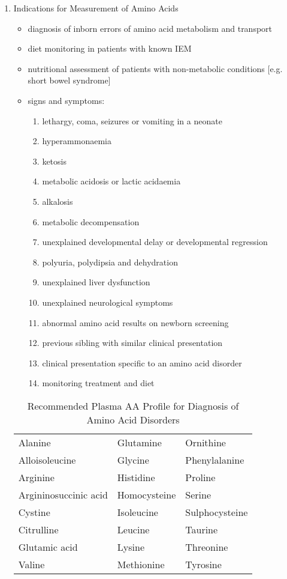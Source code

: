 \documentclass{scrartcl}
\begin{document}
\begin{enumerate}
\item Indications for Measurement of Amino Acids
\label{sec:orgfa119e3}
\begin{itemize}
\item diagnosis of inborn errors of amino acid metabolism and transport
\item diet monitoring in patients with known IEM
\item nutritional assessment of patients with non-metabolic conditions [e.g. short bowel syndrome]
\item signs and symptoms:
\begin{enumerate}
\item lethargy, coma, seizures or vomiting in a neonate
\item hyperammonaemia
\item ketosis
\item metabolic acidosis or lactic acidaemia
\item alkalosis
\item metabolic decompensation
\item unexplained developmental delay or developmental regression
\item polyuria, polydipsia and dehydration
\item unexplained liver dysfunction
\item unexplained neurological symptoms
\item abnormal amino acid results on newborn screening
\item previous sibling with similar clinical presentation
\item clinical presentation specific to an amino acid disorder
\item monitoring treatment and diet
\end{enumerate}
\end{itemize}

\begin{table}[htbp]
\caption{\label{tab:org28ee327}
Recommended Plasma AA Profile for Diagnosis of Amino Acid Disorders}
\centering
\begin{tabular}{lll}
Alanine & Glutamine & Ornithine\\
Alloisoleucine & Glycine & Phenylalanine\\
Arginine & Histidine & Proline\\
Argininosuccinic acid & Homocysteine \footnotemark & Serine\\
Cystine & Isoleucine & Sulphocysteine \footnotemark\\
Citrulline & Leucine & Taurine\\
Glutamic acid & Lysine & Threonine\\
Valine & Methionine & Tyrosine\\
\end{tabular}
\end{table}


\end{enumerate}
\end{document}
